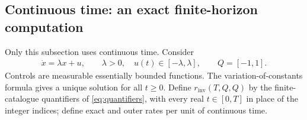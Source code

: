 \documentclass[11pt,a4paper]{article}
\theoremstyle{definition}
\theoremstyle{remark}
\begin{document}
\subsection{Continuous time: an exact finite-horizon computation}

Only this subsection uses continuous time. Consider
\begin{align*}
 \dot x=\lambda x+u,\qquad \lambda>0,\quad
 u(t)\in[-\lambda,\lambda],\qquad Q=[-1,1].
\end{align*}
Controls are measurable essentially bounded functions. The variation-of-constants formula gives a unique solution for all \(t\geq0\). Define \(r_{\mathrm{inv}}(T,Q,Q)\) by the finite-catalogue quantifiers of \eqref{eq:quantifiers}, with every real \(t\in[0,T]\) in place of the integer indices; define exact and outer rates per unit of continuous time.
\end{document}
